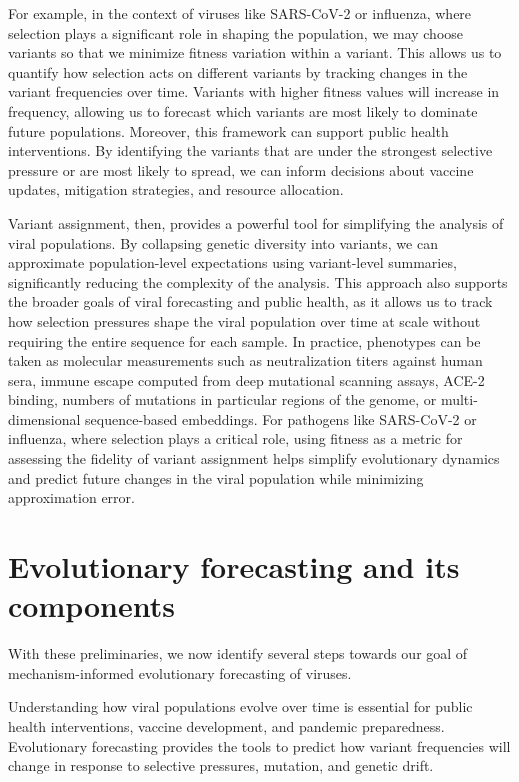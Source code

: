 For example, in the context of viruses like SARS-CoV-2 or influenza, where selection plays a significant role in shaping the population, we may choose variants so that we minimize fitness variation within a variant.
This allows us to quantify how selection acts on different variants by tracking changes in the variant frequencies over time.
Variants with higher fitness values will increase in frequency, allowing us to forecast which variants are most likely to dominate future populations.
Moreover, this framework can support public health interventions.
By identifying the variants that are under the strongest selective pressure or are most likely to spread, we can inform decisions about vaccine updates, mitigation strategies, and resource allocation.

Variant assignment, then, provides a powerful tool for simplifying the analysis of viral populations.
By collapsing genetic diversity into variants, we can approximate population-level expectations using variant-level summaries, significantly reducing the complexity of the analysis.
This approach also supports the broader goals of viral forecasting and public health, as it allows us to track how selection pressures shape the viral population over time at scale without requiring the entire sequence for each sample.
In practice, phenotypes can be taken as molecular measurements such as neutralization titers against human sera, immune escape computed from deep mutational scanning assays, ACE-2 binding, numbers of mutations in particular regions of the genome, or multi-dimensional sequence-based embeddings. \cite{Jian2023, Dadonaite2023, greaney2022antibody, Nanduri2024}
For pathogens like SARS-CoV-2 or influenza, where selection plays a critical role, using fitness as a metric for assessing the fidelity of variant assignment helps simplify evolutionary dynamics and predict future changes in the viral population while minimizing approximation error.

\section{Evolutionary forecasting and its components}%

With these preliminaries, we now identify several steps towards our goal of mechanism-informed evolutionary forecasting of viruses.

Understanding how viral populations evolve over time is essential for public health interventions, vaccine development, and pandemic preparedness. 
Evolutionary forecasting provides the tools to predict how variant frequencies will change in response to selective pressures, mutation, and genetic drift.


